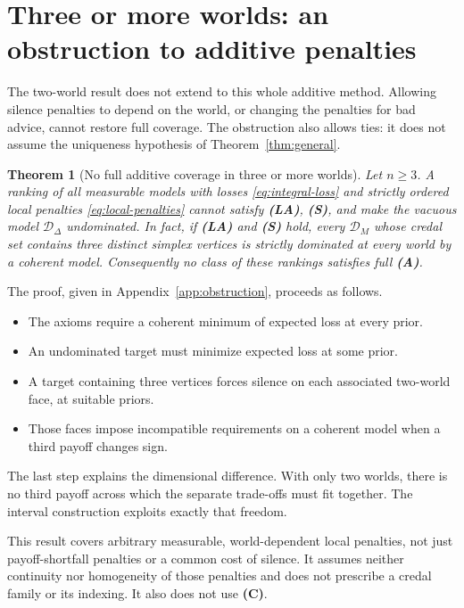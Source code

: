 \documentclass[11pt]{article}
\newtheorem{theorem}{Theorem}
\theoremstyle{remark}
\newcommand{\Dscr}{\mathcal D}
\begin{document}
\section{Three or more worlds: an obstruction to additive penalties}

The two-world result does not extend to this whole additive method. Allowing
silence penalties to depend on the world, or changing the penalties for bad
advice, cannot restore full coverage. The obstruction also allows ties: it
does not assume the uniqueness hypothesis of Theorem~\ref{thm:general}.

\begin{theorem}[No full additive coverage in three or more worlds]\label{thm:additive-obstruction}
Let $n\ge3$. A ranking of all measurable models with losses
\eqref{eq:integral-loss} and strictly ordered local penalties
\eqref{eq:local-penalties} cannot satisfy \textbf{(LA)}, \textbf{(S)}, and
make the vacuous model $\Dscr_\Delta$ undominated.
In fact, if \textbf{(LA)} and \textbf{(S)} hold, every $\Dscr_M$ whose credal
set contains three distinct simplex vertices is strictly dominated at every
world by a coherent model.
Consequently no class of these rankings satisfies full \textbf{(A)}.
\end{theorem}

The proof, given in Appendix~\ref{app:obstruction}, proceeds as follows.
\begin{itemize}[leftmargin=*,itemsep=2pt]
\item The axioms require a coherent minimum of expected loss at every prior.
\item An undominated target must minimize expected loss at some prior.
\item A target containing three vertices forces silence on each associated
two-world face, at suitable priors.
\item Those faces impose incompatible requirements on a coherent model when
a third payoff changes sign.
\end{itemize}

The last step explains the dimensional difference. With only two worlds,
there is no third payoff across which the separate trade-offs must fit
together. The interval construction exploits exactly that freedom.

This result covers arbitrary measurable, world-dependent local penalties,
not just payoff-shortfall penalties or a common cost of silence. It assumes
neither continuity nor homogeneity of those penalties and does not prescribe
a credal family or its indexing. It also does not use \textbf{(C)}.
\end{document}
